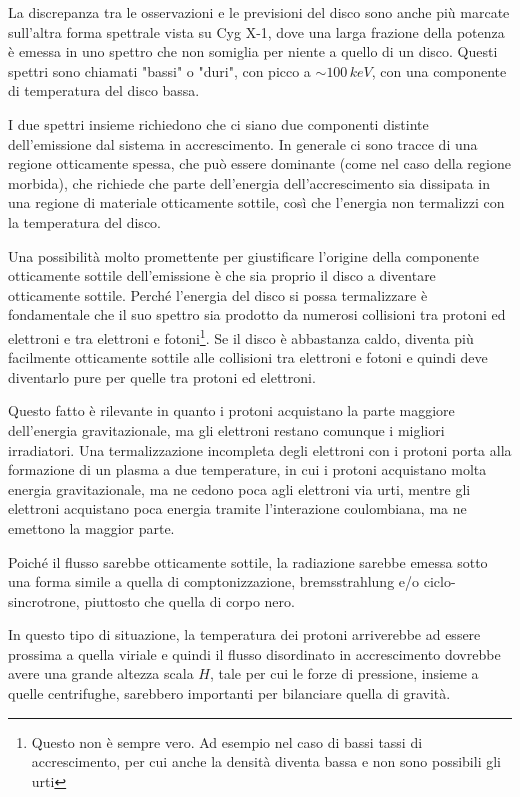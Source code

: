 \documentclass[a4paperbi]{article}
\begin{document}
La discrepanza tra le osservazioni e le previsioni del disco sono anche più marcate sull'altra forma spettrale vista su Cyg X-1, dove una larga frazione della potenza è emessa in uno spettro che non somiglia per niente a quello di un disco. Questi spettri sono chiamati "bassi" o "duri", con picco a $\sim100\,keV$, con una componente di temperatura del disco bassa.

I due spettri insieme richiedono che ci siano due componenti distinte dell'emissione dal sistema in accrescimento. In generale ci sono tracce di una regione otticamente spessa, che può essere dominante (come nel caso della regione morbida), che richiede che parte dell'energia dell'accrescimento sia dissipata in una regione di materiale otticamente sottile, così che l'energia non termalizzi con la temperatura del disco.

	Una possibilità molto promettente per giustificare l'origine della componente otticamente sottile dell'emissione è che sia proprio il disco a diventare otticamente sottile. Perché l'energia del disco si possa termalizzare è fondamentale che il suo spettro sia prodotto da numerosi collisioni tra protoni ed elettroni e tra elettroni e fotoni\footnote{Questo non è sempre vero. Ad esempio nel caso di bassi tassi di accrescimento, per cui anche la densità diventa bassa e non sono possibili gli urti}. Se il disco è abbastanza caldo, diventa più facilmente otticamente sottile alle collisioni tra elettroni e fotoni e quindi deve diventarlo pure per quelle tra protoni ed elettroni. 
	
	Questo fatto è rilevante in quanto i protoni acquistano la parte maggiore dell'energia gravitazionale, ma gli elettroni restano comunque i migliori irradiatori. Una termalizzazione incompleta degli elettroni con i protoni porta alla formazione di un plasma a due temperature, in cui i protoni acquistano molta energia gravitazionale, ma ne cedono poca agli elettroni via urti, mentre gli elettroni acquistano poca energia tramite l'interazione coulombiana, ma ne emettono la maggior parte.
	
	Poiché il flusso sarebbe otticamente sottile, la radiazione sarebbe emessa sotto una forma simile a quella di comptonizzazione, bremsstrahlung e/o ciclo-sincrotrone, piuttosto che quella di corpo nero.
	
	In questo tipo di situazione, la temperatura dei protoni arriverebbe ad essere prossima a quella viriale e quindi il flusso disordinato in accrescimento dovrebbe avere una grande altezza scala $H$, tale per cui le forze di pressione, insieme a quelle centrifughe, sarebbero importanti per bilanciare quella di gravità.
	
\end{document}
